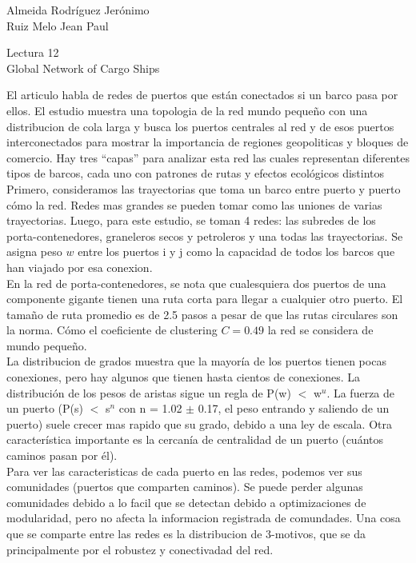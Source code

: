 \documentclass[a4paper, 11pt]{report}
\begin{document}
\begin{flushright}
    Almeida Rodríguez Jerónimo\\
    Ruiz Melo Jean Paul
\end{flushright}

\begin{center}
    {\LARGE Lectura 12}\\
    {\LARGE Global Network of Cargo Ships}
\end{center}

El articulo habla de redes de puertos que están conectados si un barco
pasa por ellos. El estudio muestra una
topologia de la red mundo pequeño con una distribucion de cola larga y busca
los puertos centrales al red y de esos puertos interconectados para mostrar la
importancia de regiones geopoliticas y bloques de comercio. Hay tres ``capas''
para analizar esta red las cuales representan diferentes tipos de barcos, cada
uno con patrones de rutas y efectos ecológicos distintos\\

Primero, consideramos las trayectorias que toma un barco entre puerto y puerto
cómo la red. Redes mas grandes se pueden tomar como las uniones de varias
trayectorias. Luego, para este estudio, se toman 4 redes: las subredes de los
porta-contenedores, graneleros secos y petroleros y una todas las
trayectorias. Se asigna peso $w$ entre los puertos i y j como la capacidad de
todos los barcos que han viajado por esa conexion. \\

En la red de porta-contenedores, se nota que cualesquiera dos puertos de
una componente gigante tienen una ruta corta para llegar a cualquier
otro puerto. El tamaño de ruta promedio es de 2.5 pasos a pesar de que las rutas
circulares son la norma. Cómo el coeficiente de clustering $C=0.49$ la red se
considera de mundo pequeño.\\

La distribucion de grados muestra que la mayoría de los puertos
tienen pocas conexiones, pero hay algunos que tienen hasta cientos de conexiones.
La distribución de los pesos de aristas sigue un regla de P(w) $<$ w$^u$. La
fuerza de un puerto (P(s) $<$ s$^n$ con n = 1.02 $\pm$ 0.17, el peso
entrando y saliendo de un puerto) suele crecer mas rapido que su grado, debido a
una ley de escala. Otra característica importante es la cercanía de centralidad
de un puerto (cuántos caminos pasan por él).\\

Para ver las caracteristicas de cada puerto en las redes, podemos ver
sus comunidades (puertos que comparten caminos). Se puede perder algunas
comunidades debido a lo facil que se
detectan debido a optimizaciones de modularidad, pero no afecta la
informacion registrada de comundades. Una cosa que se comparte
entre las redes es la distribucion de 3-motivos, que se da principalmente por
el robustez y conectivadad del red. \\
\end{document}
